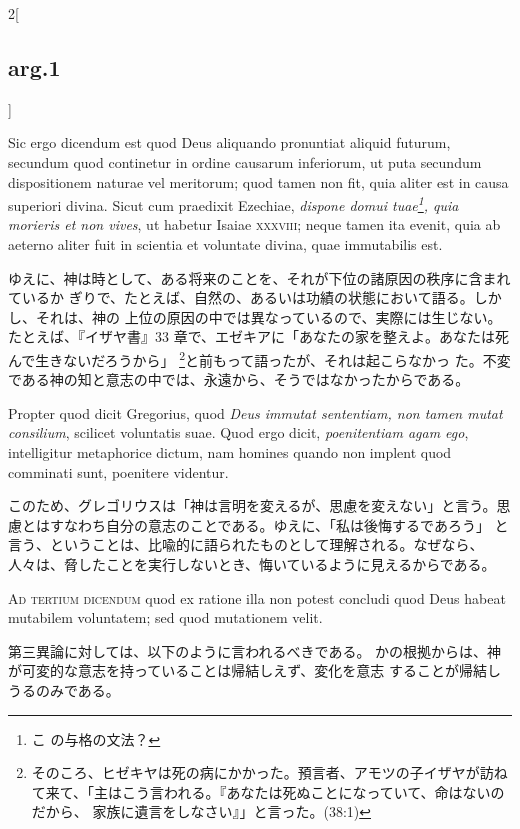 \documentclass[paper=a4paper,fontsize=10pt,jafontsize=9pt,titlepage]{jlreq}
\begin{document}
\begin{paracol}{2}[\subsection{arg.1}]
\switchcolumn*


Sic ergo dicendum est quod Deus aliquando pronuntiat aliquid futurum, secundum
 quod continetur in ordine causarum inferiorum, ut puta secundum dispositionem
 naturae vel meritorum; quod tamen non fit, quia aliter est in causa superiori
 divina. Sicut cum praedixit Ezechiae, {\itshape dispone domui tuae\footnote{こ
 の与格の文法？}, quia morieris et non vives}, ut habetur Isaiae {\scshape
 xxxviii}; neque tamen ita evenit, quia ab aeterno aliter fuit in scientia et
 voluntate divina, quae immutabilis est.

\switchcolumn

ゆえに、神は時として、ある将来のことを、それが下位の諸原因の秩序に含まれているか
 ぎりで、たとえば、自然の、あるいは功績の状態において語る。しかし、それは、神の
 上位の原因の中では異なっているので、実際には生じない。たとえば、『イザヤ書』33
 章で、エゼキアに「あなたの家を整えよ。あなたは死んで生きないだろうから」
 \footnote{そのころ、ヒゼキヤは死の病にかかった。預言者、アモツの子イザヤが訪ね
 て来て、「主はこう言われる。『あなたは死ぬことになっていて、命はないのだから、
 家族に遺言をしなさい』」と言った。(38:1)}と前もって語ったが、それは起こらなかっ
 た。不変である神の知と意志の中では、永遠から、そうではなかったからである。

\switchcolumn*


Propter
 quod dicit Gregorius, quod {\itshape Deus immutat sententiam, non tamen mutat
 consilium}, scilicet voluntatis suae. Quod ergo dicit, {\itshape poenitentiam agam
 ego}, intelligitur metaphorice dictum, nam homines quando non implent
 quod comminati sunt, poenitere videntur.

\switchcolumn

このため、グレゴリウスは「神は言明を変えるが、思慮を変えない」と言う。思
 慮とはすなわち自分の意志のことである。ゆえに、「私は後悔するであろう」
 と言う、ということは、比喩的に語られたものとして理解される。なぜなら、
 人々は、脅したことを実行しないとき、悔いているように見えるからである。

\switchcolumn*[\subsection{ad.3}]


{\scshape Ad tertium dicendum} quod ex ratione illa non
 potest concludi quod Deus habeat mutabilem voluntatem; sed quod
 mutationem velit.

\switchcolumn

第三異論に対しては、以下のように言われるべきである。
かの根拠からは、神が可変的な意志を持っていることは帰結しえず、変化を意志
 することが帰結しうるのみである。


\end{paracol}
\end{document}
